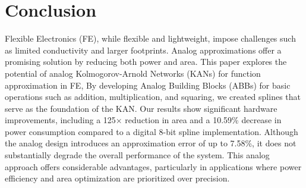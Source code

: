 \section{Conclusion}\label{sec:conclusion}

Flexible Electronics (FE), while flexible and lightweight, impose challenges such as limited conductivity and larger footprints. 
Analog approximations offer a promising solution by reducing both power and area.
This paper explores the potential of analog Kolmogorov-Arnold Networks (KANs) for function approximation in FE, 
By developing Analog Building Blocks (ABBs) for basic operations such as addition, multiplication, and squaring, we created splines that serve as the foundation of the KAN.
Our results show significant hardware improvements, including a 125$\times$ reduction in area and a 10.59\% decrease in power consumption compared to a digital 8-bit spline implementation. 
Although the analog design introduces an approximation error of up to 7.58\%, it does not substantially degrade the overall performance of the system.
This analog approach offers considerable advantages, particularly in applications where power efficiency and area optimization are prioritized over precision.

